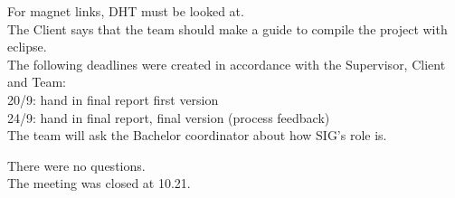 \documentclass[pdftex, 12pt, a4paper]{report}
\begin{document}
\begin{enumerate}
For magnet links, DHT must be looked at.\\

The Client says that the team should make a guide to compile the project with eclipse.\\

The following deadlines were created in accordance with the Supervisor, Client and Team:\\
20/9: hand in final report first version\\
24/9: hand in final report, final version (process feedback)\\

The team will ask the Bachelor coordinator about how SIG's role is.\\
\end{enumerate}

\noindent There were no questions.\\
The meeting was closed at 10.21.\\
\end{document}
